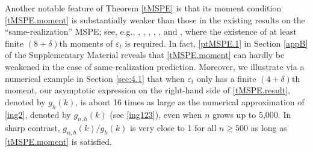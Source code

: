 \documentclass[ejsv2]{imsart}
\theoremstyle{plain}
\theoremstyle{definition}
\theoremstyle{remark}
\newtheorem{remark}{Remark}[section]
\begin{document}
Another notable feature of Theorem \ref{tMSPE} is that its moment condition
\eqref{tMSPE.moment} is substantially weaker than those in the existing results on
the ``same-realization'' MSPE; see, e.g., \cite{Chi2021}, \cite{Fuller1981}, \cite{Ryan2013}, \cite{Hsu2019},
\cite{Ing2003}, and \cite{Kunitomo1985a},
where the existence of at least finite $(8+\delta)$th moments
of $\varepsilon_t$ is required.
In fact,
\eqref{ptMSPE.1} in Section \ref{appB} of the Supplementary Material reveals that
\eqref{tMSPE.moment} can hardly be weakened in the case of same-realization prediction.
Moreover, we illustrate via a numerical example in Section \ref{sec:4.1} %
that when $\varepsilon_t$ only has a finite $(4+\delta)$th moment,
our asymptotic expression
on the right-hand side of
\eqref{tMSPE.result}, denoted by
$g_h(k)$,
is about 16 times as large as
the numerical approximation
of \eqref{ing2}, denoted by
$g_{n,h}(k)$ (see \eqref{ing123}), even when $n$ grows up to 5,000.
In sharp contrast,
$g_{n,h}(k)/g_{h}(k)$ is very close to 1 for all $n \geq 500$
as long as \eqref{tMSPE.moment} is satisfied.
\end{document}
